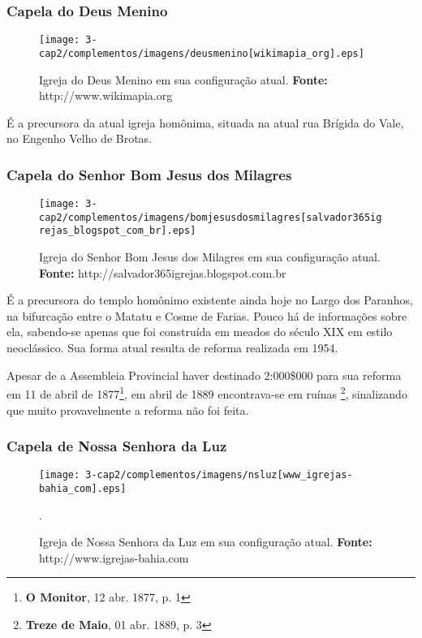 \subsubsection{Capela do Deus Menino}

\begin{figure}[!htp]
\centering
\texttt{[image: 3-cap2/complementos/imagens/deusmenino[wikimapia\_org].eps]} 
\caption{Igreja do Deus Menino em sua configuração atual. \textbf{Fonte:} http://www.wikimapia.org}
\end{figure}

É a precursora da atual igreja homônima, situada na atual rua Brígida do Vale, no Engenho Velho de Brotas. 

\subsubsection{Capela do Senhor Bom Jesus dos Milagres}

\begin{figure}[!htp]
\centering
\texttt{[image: 3-cap2/complementos/imagens/bomjesusdosmilagres[salvador365igrejas\_blogspot\_com\_br].eps]} 
\caption{Igreja do Senhor Bom Jesus dos Milagres em sua configuração atual. \textbf{Fonte:} http://salvador365igrejas.blogspot.com.br}
\end{figure}

É a precursora do templo homônimo existente ainda hoje no Largo dos Paranhos, na bifurcação entre o Matatu e Cosme de Farias. Pouco há de informações sobre ela, sabendo-se apenas que foi construída em meados do século XIX em estilo neoclássico. Sua forma atual resulta de reforma realizada em 1954.

Apesar de a Assembleia Provincial haver destinado 2:000\$000 para sua reforma em 11 de abril de 1877\footnote{\textbf{O Monitor}, 12 abr. 1877, p. 1}, em abril de 1889 encontrava-se em ruínas \footnote{\textbf{Treze de Maio}, 01 abr. 1889, p. 3}, sinalizando que muito provavelmente a reforma não foi feita.

\subsubsection{Capela de Nossa Senhora da Luz}

\begin{figure}[!htp]
\centering
\texttt{[image: 3-cap2/complementos/imagens/nsluz[www\_igrejas-bahia\_com].eps]} 
\caption{Igreja de Nossa Senhora da Luz em sua configuração atual. \textbf{Fonte:} http://www.igrejas-bahia.com}.
\end{figure}

